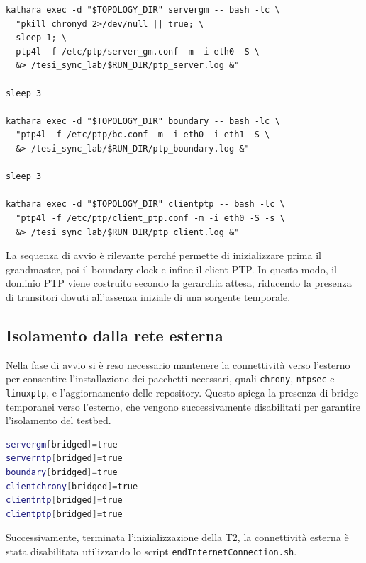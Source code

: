 \begin{listing}[H]
\begin{verbatim}
kathara exec -d "$TOPOLOGY_DIR" servergm -- bash -lc \
  "pkill chronyd 2>/dev/null || true; \
  sleep 1; \
  ptp4l -f /etc/ptp/server_gm.conf -m -i eth0 -S \
  &> /tesi_sync_lab/$RUN_DIR/ptp_server.log &"

sleep 3

kathara exec -d "$TOPOLOGY_DIR" boundary -- bash -lc \
  "ptp4l -f /etc/ptp/bc.conf -m -i eth0 -i eth1 -S \
  &> /tesi_sync_lab/$RUN_DIR/ptp_boundary.log &"

sleep 3

kathara exec -d "$TOPOLOGY_DIR" clientptp -- bash -lc \
  "ptp4l -f /etc/ptp/client_ptp.conf -m -i eth0 -S -s \
  &> /tesi_sync_lab/$RUN_DIR/ptp_client.log &"
\end{verbatim}
\caption{Esempio di avvio controllato dei demoni PTP.}
\label{lst:ptp_start_sequence}
\end{listing}

La sequenza di avvio è rilevante perché permette di inizializzare prima il grandmaster,
poi il boundary clock e infine il client PTP. In questo modo, il dominio PTP
viene costruito secondo la gerarchia attesa, riducendo la presenza di transitori dovuti
all'assenza iniziale di una sorgente temporale.

\subsection{Isolamento dalla rete esterna}

Nella fase di avvio si è reso necessario mantenere la connettività 
verso l'esterno per consentire l'installazione dei pacchetti necessari, 
quali \texttt{chrony}, \texttt{ntpsec} e \texttt{linuxptp}, e l'aggiornamento 
delle repository. Questo spiega la presenza di bridge temporanei verso l'esterno,
 che vengono successivamente disabilitati per garantire l'isolamento del testbed.

\begin{lstlisting}[language=bash,caption={Estratto del file \texttt{lab.conf}: bridge temporaneo verso l'esterno.},label={lst:labconf_bridged}]
servergm[bridged]=true
serverntp[bridged]=true
boundary[bridged]=true
clientchrony[bridged]=true
clientntp[bridged]=true
clientptp[bridged]=true
\end{lstlisting}

Successivamente, terminata l'inizializzazione della T2, la connettività esterna è stata
disabilitata utilizzando lo script \texttt{endInternetConnection.sh}.

